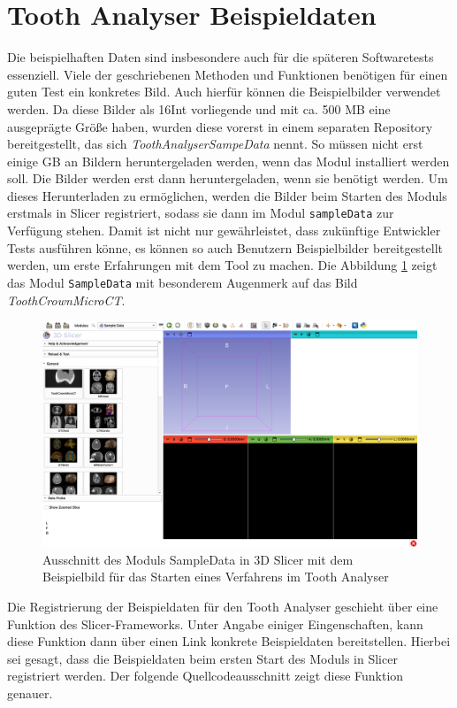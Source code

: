 \section{Tooth Analyser Beispieldaten}
\label{sec:beispieldaten} Die beispielhaften Daten sind insbesondere auch für
die späteren Softwaretests essenziell. Viele der geschriebenen Methoden und Funktionen
benötigen für einen guten Test ein konkretes Bild. Auch hierfür können die
Beispielbilder verwendet werden. Da diese Bilder als \ac{16Int} vorliegende und
mit ca. 500 \ac{MB} eine ausgeprägte Größe haben, wurden diese vorerst in einem separaten
Repository bereitgestellt, das sich \textit{ToothAnalyserSampeData} nennt. So
müssen nicht erst einige \ac{GB} an Bildern heruntergeladen werden, wenn das
Modul installiert werden soll. Die Bilder werden erst dann heruntergeladen, wenn
sie benötigt werden. Um dieses Herunterladen zu ermöglichen, werden die Bilder
beim Starten des Moduls erstmals in Slicer registriert, sodass sie dann im Modul
\texttt{sampleData} zur Verfügung stehen. Damit ist nicht nur gewährleistet,
dass zukünftige Entwickler Tests ausführen könne, es können so auch Benutzern Beispielbilder
bereitgestellt werden, um erste Erfahrungen mit dem Tool zu machen. Die Abbildung
\ref{fig:sample_data} zeigt das Modul \texttt{SampleData} mit besonderem
Augenmerk auf das Bild \textit{ToothCrownMicroCT}.

\begin{figure}[h]
	\centering
	\includegraphics[width=1\textwidth]{img/sampleData.png}
	\caption{Ausschnitt des Moduls SampleData in 3D Slicer mit dem Beispielbild
	für das Starten eines Verfahrens im Tooth Analyser}
	\label{fig:sample_data}
\end{figure}

Die Registrierung der Beispieldaten für den Tooth Analyser geschieht über eine
Funktion des Slicer-Frameworks. Unter Angabe einiger Eingenschaften, kann diese
Funktion dann über einen Link konkrete Beispieldaten bereitstellen. Hierbei sei gesagt,
dass die Beispieldaten beim ersten Start des Moduls in Slicer registriert werden.
Der folgende Quellcodeausschnitt zeigt diese Funktion genauer.


